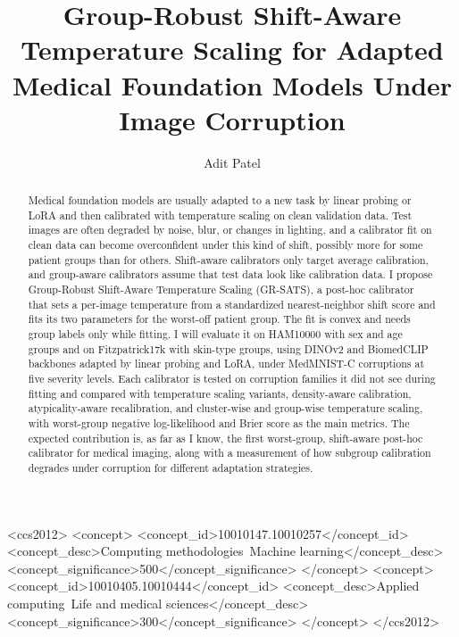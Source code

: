 \documentclass[sigconf,nonacm]{acmart}
\begin{document}
\title{Group-Robust Shift-Aware Temperature Scaling for Adapted Medical
  Foundation Models Under Image Corruption}

\author{Adit Patel}

\renewcommand{\shortauthors}{Patel}

\begin{abstract}
Medical foundation models are usually adapted to a new task by linear
probing or LoRA and then calibrated with temperature scaling on clean
validation data. Test images are often degraded by noise, blur, or changes
in lighting, and a calibrator fit on clean data can become overconfident
under this kind of shift, possibly more for some patient groups than for
others. Shift-aware calibrators only target average calibration, and
group-aware calibrators assume that test data look like calibration data. I
propose Group-Robust Shift-Aware Temperature Scaling (GR-SATS), a post-hoc
calibrator that sets a per-image temperature from a standardized
nearest-neighbor shift score and fits its two parameters for the worst-off
patient group. The fit is convex and needs group labels only while fitting.
I will evaluate it on HAM10000 with sex and age groups and on Fitzpatrick17k
with skin-type groups, using DINOv2 and BiomedCLIP backbones adapted by
linear probing and LoRA, under MedMNIST-C corruptions at five severity
levels. Each calibrator is tested on corruption families it did not see
during fitting and compared with temperature scaling variants, density-aware
calibration, atypicality-aware recalibration, and cluster-wise and group-wise
temperature scaling, with worst-group negative log-likelihood and Brier score
as the main metrics. The expected contribution is, as far as I know, the
first worst-group, shift-aware post-hoc calibrator for medical imaging, along
with a measurement of how subgroup calibration degrades under corruption for
different adaptation strategies.
\end{abstract}

\begin{CCSXML}
<ccs2012>
 <concept>
  <concept_id>10010147.10010257</concept_id>
  <concept_desc>Computing methodologies~Machine learning</concept_desc>
  <concept_significance>500</concept_significance>
 </concept>
 <concept>
  <concept_id>10010405.10010444</concept_id>
  <concept_desc>Applied computing~Life and medical sciences</concept_desc>
  <concept_significance>300</concept_significance>
 </concept>
</ccs2012>
\end{CCSXML}
\end{document}
